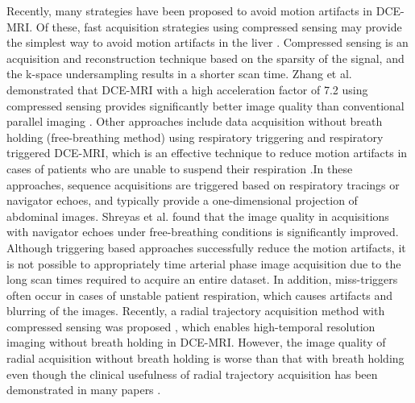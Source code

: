 \documentclass[num-refs]{wiley-article}
\begin{document}
 Recently, many strategies have been proposed to avoid motion artifacts in DCE-MRI. Of these, fast acquisition strategies using compressed sensing may provide the simplest way to avoid motion artifacts in the liver \cite{vasanawala2010improved}\cite{zhang2014clinical}\cite{jaimes2016strategies}. Compressed sensing is an acquisition and reconstruction technique based on the sparsity of the signal, and the k-space undersampling results in a shorter scan time. Zhang et al. demonstrated that DCE-MRI with a high acceleration factor of 7.2 using compressed sensing provides significantly better image quality than conventional parallel imaging \cite{zhang2014clinical}. Other approaches include data acquisition without breath holding (free-breathing method) using respiratory triggering and respiratory triggered DCE-MRI, which is an effective technique to reduce motion artifacts in cases of patients who are unable to suspend their respiration \cite{vasanawala2010navigated}\cite{chavhan2013abdominal}.In these approaches, sequence acquisitions are triggered based on respiratory tracings or navigator echoes, and typically provide a one-dimensional projection of abdominal images. Shreyas et al. found that the image quality in acquisitions with navigator echoes under free-breathing conditions is significantly improved. Although triggering based approaches successfully reduce the motion artifacts, it is not possible to appropriately time arterial phase image acquisition due to the long scan times required to acquire an entire dataset. In addition, miss-triggers often occur in cases of unstable patient respiration, which causes artifacts and blurring of the images. Recently, a radial trajectory acquisition method with compressed sensing was proposed  \cite{feng2014golden}\cite{feng2016xd}, which enables high-temporal resolution imaging without breath holding in DCE-MRI. However, the image quality of radial acquisition without breath holding is worse than that with breath holding even though the clinical usefulness of radial trajectory acquisition has been demonstrated in many papers \cite{chandarana2011free}\cite{chandarana2013free}.\cite{chandarana2014free}

\end{document}
